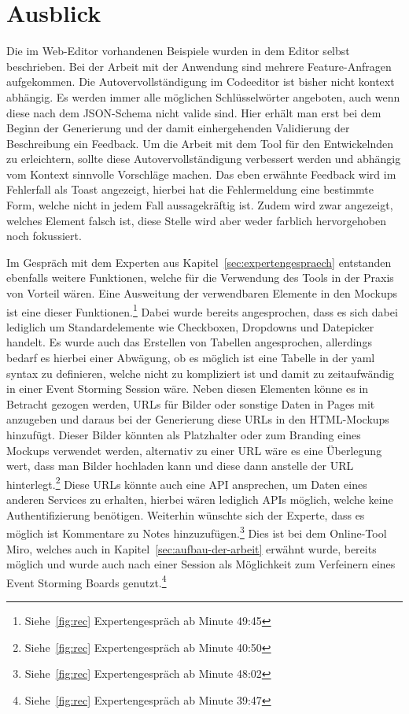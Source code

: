 \chapter{Ausblick}\label{ch:ausblick}

Die im Web-Editor vorhandenen Beispiele wurden in dem Editor selbst beschrieben.
Bei der Arbeit mit der Anwendung sind mehrere Feature-Anfragen aufgekommen.
Die Autovervollständigung im Codeeditor ist bisher nicht kontext abhängig.
Es werden immer alle möglichen Schlüsselwörter angeboten, auch wenn diese nach dem JSON-Schema nicht valide sind.
Hier erhält man erst bei dem Beginn der Generierung und der damit einhergehenden Validierung der Beschreibung ein Feedback.
Um die Arbeit mit dem Tool für den Entwickelnden zu erleichtern, sollte diese Autovervollständigung verbessert werden und abhängig vom Kontext
sinnvolle Vorschläge machen.
Das eben erwähnte Feedback wird im Fehlerfall als Toast angezeigt, hierbei hat die Fehlermeldung eine bestimmte Form, welche nicht in jedem Fall aussagekräftig ist.
Zudem wird zwar angezeigt, welches Element falsch ist, diese Stelle wird aber weder farblich hervorgehoben noch fokussiert.

Im Gespräch mit dem Experten aus Kapitel~\ref{sec:expertengespraech} entstanden ebenfalls weitere Funktionen, welche für die Verwendung des Tools in der Praxis von Vorteil wären.
Eine Ausweitung der verwendbaren Elemente in den Mockups ist eine dieser Funktionen.\footnote{Siehe~\ref{fig:rec} Expertengespräch ab Minute  49:45}
Dabei wurde bereits angesprochen, dass es sich dabei lediglich um Standardelemente wie Checkboxen, Dropdowns und Datepicker handelt.
Es wurde auch das Erstellen von Tabellen angesprochen, allerdings bedarf es hierbei einer Abwägung, ob es möglich ist eine Tabelle in der yaml syntax zu definieren,
welche nicht zu kompliziert ist und damit zu zeitaufwändig in einer Event Storming Session wäre.
Neben diesen Elementen könne es in Betracht gezogen werden, URLs für Bilder oder sonstige Daten in Pages mit anzugeben und
daraus bei der Generierung diese URLs in den HTML-Mockups hinzufügt.
Dieser Bilder könnten als Platzhalter oder zum Branding eines Mockups verwendet werden, alternativ zu einer URL wäre es eine Überlegung wert, dass man Bilder hochladen kann und
diese dann anstelle der URL hinterlegt.\footnote{Siehe~\ref{fig:rec} Expertengespräch ab Minute  40:50}
Diese URLs könnte auch eine API ansprechen, um Daten eines anderen Services zu erhalten, hierbei wären lediglich APIs möglich, welche keine Authentifizierung benötigen.
Weiterhin wünschte sich der Experte, dass es möglich ist Kommentare zu Notes hinzuzufügen.\footnote{Siehe~\ref{fig:rec} Expertengespräch ab Minute  48:02}
Dies ist bei dem Online-Tool Miro, welches auch in Kapitel~\ref{sec:aufbau-der-arbeit} erwähnt wurde, bereits möglich und wurde auch nach einer Session als Möglichkeit
zum Verfeinern eines Event Storming Boards genutzt.\footnote{Siehe~\ref{fig:rec} Expertengespräch ab Minute  39:47}

